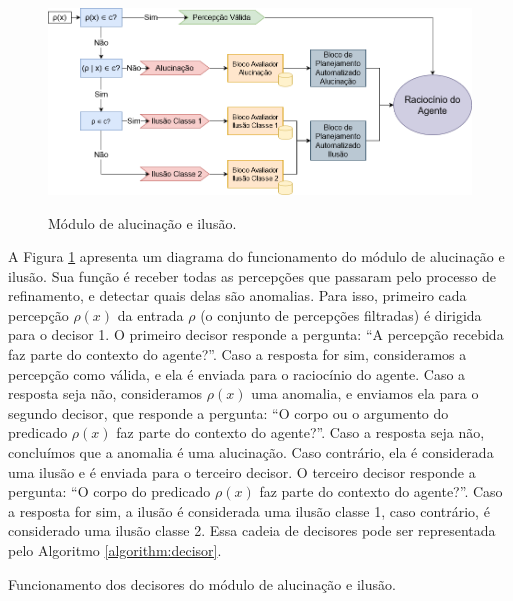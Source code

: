\begin{figure}[h]
    \centering
    \caption{Módulo de alucinação e ilusão.}
    \includegraphics[width=1\textwidth]{images/diagrama-modelo.png}
    \label{fig:model}
\end{figure}
 
 A Figura \ref{fig:model} apresenta um diagrama do funcionamento do módulo de alucinação e ilusão. Sua função é receber todas as percepções que passaram pelo processo de refinamento, e detectar quais delas são anomalias. Para isso, primeiro cada percepção $\rho(x)$ da entrada $\rho$ (o conjunto de percepções filtradas) é dirigida para o decisor 1. O primeiro decisor responde a pergunta: ``A percepção recebida faz parte do contexto do agente?''. Caso a resposta for sim, consideramos a percepção como válida, e ela é enviada para o raciocínio do agente. Caso a resposta seja não, consideramos $\rho(x)$ uma anomalia, e enviamos ela para o segundo decisor, que responde a pergunta: ``O corpo ou o argumento do predicado $\rho(x)$ faz parte do contexto do agente?''. Caso a resposta seja não, concluímos que a anomalia é uma alucinação. Caso contrário, ela é considerada uma ilusão e é enviada para o terceiro decisor. O terceiro decisor responde a pergunta: ``O corpo do predicado $\rho(x)$ faz parte do contexto do agente?''. Caso a resposta for sim, a ilusão é considerada uma ilusão classe 1, caso contrário, é considerado uma ilusão classe 2. Essa cadeia de decisores pode ser representada pelo Algoritmo \ref{algorithm:decisor}.

\begin{algorithm}[H]
 \caption{Funcionamento dos decisores do módulo de alucinação e ilusão.}
\end{algorithm}

